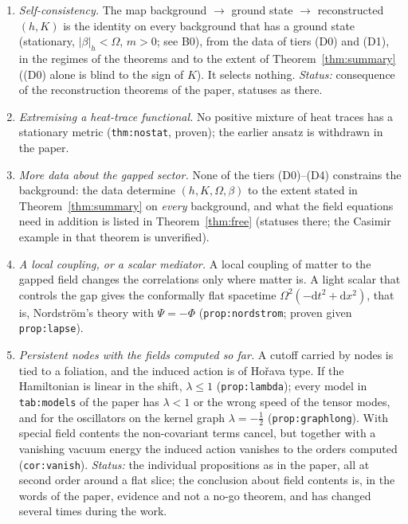 \documentclass[a4paper,11pt]{article}
\theoremstyle{definition}
\theoremstyle{remark}
\newcommand{\dd}{\mathrm{d}}
\begin{document}
\begin{enumerate}
\item[(X1)] \emph{Self-consistency.} The map background $\to$ ground state $\to$ reconstructed $(h,K)$ is the identity on every background that has a ground state (stationary, $|\beta|_h<\Omega$, $m>0$; see B0), from the data of tiers \textup{(D0)} and \textup{(D1)}, in the regimes of the theorems and to the extent of Theorem~\ref{thm:summary} (\textup{(D0)} alone is blind to the sign of $K$). It selects nothing. \emph{Status:} consequence of the reconstruction theorems of the paper, statuses as there.
\item[(X2)] \emph{Extremising a heat-trace functional.} No positive mixture of heat traces has a stationary metric (\texttt{thm:nostat}, proven); the earlier ansatz is withdrawn in the paper.
\item[(X3)] \emph{More data about the gapped sector.} None of the tiers \textup{(D0)}--\textup{(D4)} constrains the background: the data determine $(h,K,\Omega,\beta)$ to the extent stated in Theorem~\ref{thm:summary} on \emph{every} background, and what the field equations need in addition is listed in Theorem~\ref{thm:free} (statuses there; the Casimir example in that theorem is unverified).
\item[(X4)] \emph{A local coupling, or a scalar mediator.} A local coupling of matter to the gapped field changes the correlations only where matter is. A light scalar that controls the gap gives the conformally flat spacetime $\Omega^2(-\dd t^2+\dd x^2)$, that is, Nordstr\"om's theory with $\Psi=-\Phi$ (\texttt{prop:nordstrom}; proven given \texttt{prop:lapse}).
\item[(X5)] \emph{Persistent nodes with the fields computed so far.} A cutoff carried by nodes is tied to a foliation, and the induced action is of Ho\v{r}ava type. If the Hamiltonian is linear in the shift, $\lambda\le1$ (\texttt{prop:lambda}); every model in \texttt{tab:models} of the paper has $\lambda<1$ or the wrong speed of the tensor modes, and for the oscillators on the kernel graph $\lambda=-\tfrac12$ (\texttt{prop:graphlong}). With special field contents the non-covariant terms cancel, but together with a vanishing vacuum energy the induced action vanishes to the orders computed (\texttt{cor:vanish}). \emph{Status:} the individual propositions as in the paper, all at second order around a flat slice; the conclusion about field contents is, in the words of the paper, evidence and not a no-go theorem, and has changed several times during the work.
\end{enumerate}
\end{document}
